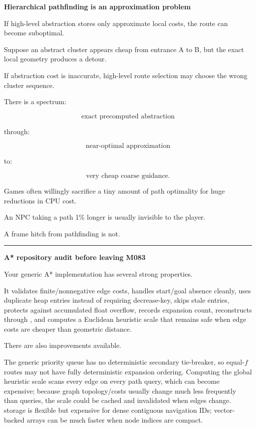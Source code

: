 \textbf{Hierarchical pathfinding is an approximation problem}

If high-level abstraction stores only approximate local costs, the route can become suboptimal.

Suppose an abstract cluster appears cheap from entrance A to B, but the exact local geometry produces a detour.

If abstraction cost is inaccurate, high-level route selection may choose the wrong cluster sequence.

There is a spectrum:

\[
\text{exact precomputed abstraction}
\]

through:

\[
\text{near-optimal approximation}
\]

to:

\[
\text{very cheap coarse guidance}.
\]

Games often willingly sacrifice a tiny amount of path optimality for huge reductions in CPU cost.

An NPC taking a path 1\% longer is usually invisible to the player.

A frame hitch from pathfinding is not.

\begin{center}\rule{0.5\linewidth}{0.5pt}\end{center}

\textbf{A* repository audit before leaving M083}

Your generic A* implementation has several strong properties.

It validates finite/nonnegative edge costs, handles start/goal absence cleanly, uses duplicate heap entries instead of requiring decrease-key, skips stale entries, protects against accumulated float overflow, records expansion count, reconstructs through , and computes a Euclidean heuristic scale that remains safe when edge costs are cheaper than geometric distance.

There are also improvements available.

The generic priority queue has no deterministic secondary tie-breaker, so equal-\(f\) routes may not have fully deterministic expansion ordering. Computing the global heuristic scale scans every edge on every path query, which can become expensive; because graph topology/costs usually change much less frequently than queries, the scale could be cached and invalidated when edges change.  storage is flexible but expensive for dense contiguous navigation IDs; vector-backed arrays can be much faster when node indices are compact.

